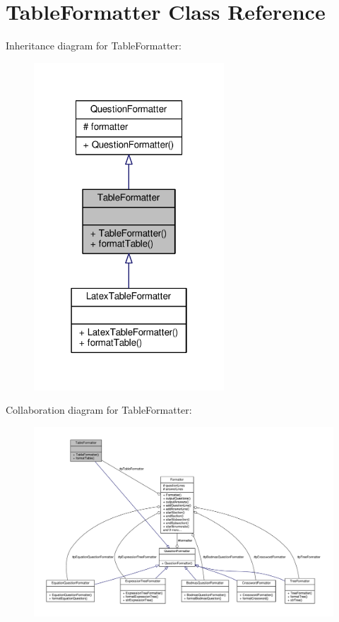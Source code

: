 \hypertarget{classTableFormatter}{}\section{Table\+Formatter Class Reference}
\label{classTableFormatter}


Inheritance diagram for Table\+Formatter\+:
\nopagebreak
\begin{figure}[H]
\begin{center}
\leavevmode
\includegraphics[width=202pt]{classTableFormatter__inherit__graph}
\end{center}
\end{figure}


Collaboration diagram for Table\+Formatter\+:
\nopagebreak
\begin{figure}[H]
\begin{center}
\leavevmode
\includegraphics[width=350pt]{classTableFormatter__coll__graph}
\end{center}
\end{figure}
